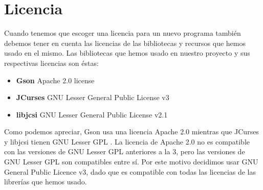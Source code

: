 \section{Licencia}

Cuando tenemos que escoger una licencia para un nuevo programa también debemos tener en cuenta las licencias de las bibliotecas y recursos que hemos usado en el mismo. Las bibliotecas que hemos usado en nuestro proyecto y sus respectivas licencias son éstas:

\begin{itemize}
  \item \textbf{Gson} Apache 2.0 license
  \item \textbf{JCurses} GNU Lesser General Public License v3
  \item \textbf{libjcsi} GNU Lesser General Public License v2.1
\end{itemize}

\noindent Como podemos apreciar, Gson usa una licencia Apache 2.0\cite{website:apachelicense} mientras que JCurses y libjcsi tienen GNU Lesser GPL \cite{website:gnulicense}.
La licencia de Apache 2.0 no es compatible con las versiones de GNU Lesser GPL anteriores a la 3, pero las versiones de GNU Lesser GPL son compatibles entre sí.
Por este motivo decidimos usar GNU General Public Licence v3, dado que es compatible con todas las licencias de las librerías que hemos usado.